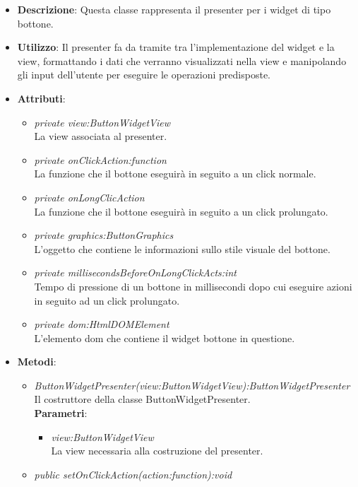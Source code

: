 \begin{itemize}
\item \textbf{Descrizione}: Questa classe rappresenta il presenter per i widget di tipo bottone.
\item \textbf{Utilizzo}: Il presenter fa da tramite tra l'implementazione del widget e la view, formattando i dati che verranno visualizzati nella view e manipolando gli input dell'utente per eseguire le operazioni predisposte.
\item \textbf{Attributi}:
	\begin{itemize}
	\item \textit{private view:ButtonWidgetView}\\
	La view associata al presenter.
	\item \textit{private onClickAction:function}\\
	La funzione che il bottone eseguirà in seguito a un click normale.
	\item \textit{private onLongClicAction}\\
	La funzione che il bottone eseguirà in seguito a un click prolungato.
	\item \textit{private graphics:ButtonGraphics}\\
	L'oggetto che contiene le informazioni sullo stile visuale del bottone.
	\item \textit{private millisecondsBeforeOnLongClickActs:int}\\
	Tempo di pressione di un bottone in millisecondi dopo cui eseguire azioni in seguito ad un click prolungato.
	\item \textit{private dom:HtmlDOMElement}\\
	L'elemento dom che contiene il widget bottone in questione.
	\end{itemize}
\item \textbf{Metodi}:
	\begin{itemize}
	\item \textit{ButtonWidgetPresenter(view:ButtonWidgetView):ButtonWidgetPresenter}\\
	Il costruttore della classe ButtonWidgetPresenter.
		\\ \textbf{Parametri}: \begin{itemize}
		\item \textit{view:ButtonWidgetView}\\
		La view necessaria alla costruzione del presenter.
		\end{itemize}
	\item \textit{public setOnClickAction(action:function):void}\\

\end{itemize}
\end{itemize}

